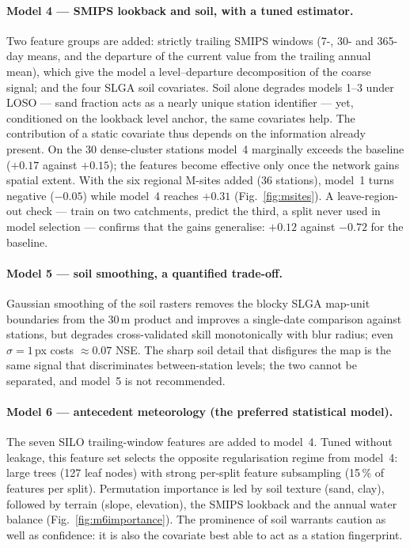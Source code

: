 \documentclass[11pt,a4paper]{article}
\begin{document}
\paragraph{Model 4 --- SMIPS lookback and soil, with a tuned estimator.} Two
feature groups are added: strictly trailing SMIPS windows (7-, 30- and
365-day means, and the departure of the current value from the trailing annual
mean), which give the model a level--departure decomposition of the coarse
signal; and the four SLGA soil covariates. Soil alone degrades models 1--3
under LOSO --- sand fraction acts as a nearly unique station identifier ---
yet, conditioned on the lookback level anchor, the same covariates help. The
contribution of a static covariate thus depends on the information already
present. On the 30 dense-cluster stations model~4 marginally exceeds the
baseline ($+0.17$ against $+0.15$); the features become effective only once
the network gains spatial extent. With the six regional M-sites added (36
stations), model~1 turns negative ($-0.05$) while model~4 reaches $+0.31$
(Fig.~\ref{fig:msites}). A leave-region-out check --- train on two catchments,
predict the third, a split never used in model selection --- confirms that the
gains generalise: $+0.12$ against $-0.72$ for the baseline.

\paragraph{Model 5 --- soil smoothing, a quantified trade-off.} Gaussian
smoothing of the soil rasters removes the blocky SLGA map-unit boundaries from
the 30\,m product and improves a single-date comparison against stations, but
degrades cross-validated skill monotonically with blur radius; even
$\sigma = 1$\,px costs ${\approx}0.07$ NSE. The sharp soil detail that
disfigures the map is the same signal that discriminates between-station
levels; the two cannot be separated, and model~5 is not recommended.

\paragraph{Model 6 --- antecedent meteorology (the preferred statistical
model).} The seven SILO trailing-window features are added to model~4. Tuned
without leakage, this feature set selects the opposite regularisation regime
from model~4: large trees (127 leaf nodes) with strong per-split feature
subsampling (15\,\% of features per split). Permutation importance is led by
soil texture (sand, clay), followed by terrain (slope, elevation), the SMIPS
lookback and the annual water balance (Fig.~\ref{fig:m6importance}). The
prominence of soil warrants caution as well as confidence: it is also the
covariate best able to act as a station fingerprint.
\end{document}
